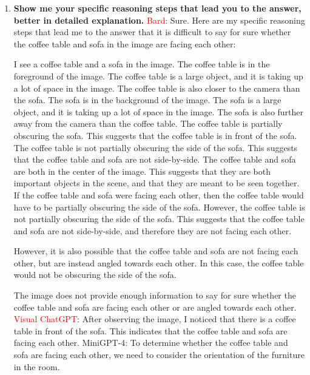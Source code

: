 \begin{enumerate}
    Based on these clues, it is possible that the coffee table and sofa in the image are facing each other. However, it is also possible that they are not. The image does not provide enough information to say for sure.
    \subitem \textcolor{red}{Visual ChatGPT}: The woman is standing in front of the mirror.
    \subitem MiniGPT-4: No, the coffee table and sofa are not facing each other. The coffee table is positioned in front of the sofa, and the sofa is positioned next to the coffee table.
    \item \textbf{Show me your specific reasoning steps that lead you to the answer, better in detailed explanation.}
    \subitem \textcolor{Red}{Bard}: 
    Sure. Here are my specific reasoning steps that lead me to the answer that it is difficult to say for sure whether the coffee table and sofa in the image are facing each other:
    
    I see a coffee table and a sofa in the image.
    The coffee table is in the foreground of the image. The coffee table is a large object, and it is taking up a lot of space in the image. The coffee table is also closer to the camera than the sofa.
    The sofa is in the background of the image. The sofa is a large object, and it is taking up a lot of space in the image. The sofa is also further away from the camera than the coffee table.
    The coffee table is partially obscuring the sofa. This suggests that the coffee table is in front of the sofa.
    The coffee table is not partially obscuring the side of the sofa. This suggests that the coffee table and sofa are not side-by-side.
    The coffee table and sofa are both in the center of the image. This suggests that they are both important objects in the scene, and that they are meant to be seen together.
    If the coffee table and sofa were facing each other, then the coffee table would have to be partially obscuring the side of the sofa. However, the coffee table is not partially obscuring the side of the sofa. This suggests that the coffee table and sofa are not side-by-side, and therefore they are not facing each other.
    
    However, it is also possible that the coffee table and sofa are not facing each other, but are instead angled towards each other. In this case, the coffee table would not be obscuring the side of the sofa.
    
    The image does not provide enough information to say for sure whether the coffee table and sofa are facing each other or are angled towards each other.
    \subitem \textcolor{red}{Visual ChatGPT}: After observing the image, I noticed that there is a coffee table in front of the sofa. This indicates that the coffee table and sofa are facing each other.
    \subitem MiniGPT-4: To determine whether the coffee table and sofa are facing each other, we need to consider the orientation of the furniture in the room.


\end{enumerate}
